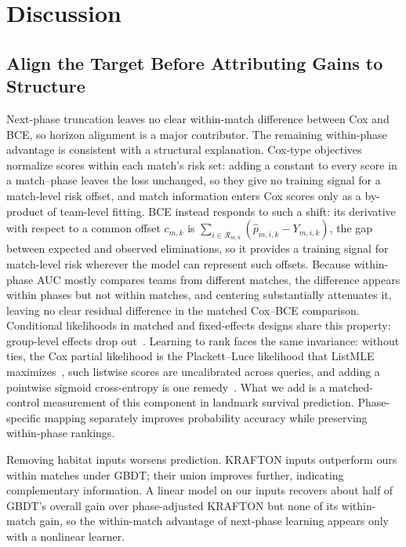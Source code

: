 \documentclass[sigconf,anonymous,nonacm]{acmart}
\begin{document}
\section{Discussion}
\label{sec:discussion}
\subsection{Align the Target Before Attributing Gains to Structure}
\label{sec:discussion:drivers}
Next-phase truncation leaves no clear within-match difference between Cox and BCE, so horizon alignment is a major contributor. The remaining within-phase advantage is consistent with a structural explanation. Cox-type objectives normalize scores within each match's risk set: adding a constant to every score in a match--phase leaves the loss unchanged, so they give no training signal for a match-level risk offset, and match information enters Cox scores only as a by-product of team-level fitting. BCE instead responds to such a shift: its derivative with respect to a common offset $c_{m,k}$ is $\sum_{i\in\mathcal{R}_{m,k}}(\hat p_{m,i,k}-Y_{m,i,k})$, the gap between expected and observed eliminations, so it provides a training signal for match-level risk wherever the model can represent such offsets. Because within-phase AUC mostly compares teams from different matches, the difference appears within phases but not within matches, and centering substantially attenuates it, leaving no clear residual difference in the matched Cox--BCE comparison. Conditional likelihoods in matched and fixed-effects designs share this property: group-level effects drop out~\cite{Chamberlain80}. Learning to rank faces the same invariance: without ties, the Cox partial likelihood is the Plackett--Luce likelihood that ListMLE maximizes~\cite{Xia08}, such listwise scores are uncalibrated across queries, and adding a pointwise sigmoid cross-entropy is one remedy~\cite{Bai23}. What we add is a matched-control measurement of this component in landmark survival prediction. Phase-specific mapping separately improves probability accuracy while preserving within-phase rankings.

Removing habitat inputs worsens prediction. KRAFTON inputs outperform ours within matches under GBDT; their union improves further, indicating complementary information. A linear model on our inputs recovers about half of GBDT's overall gain over phase-adjusted KRAFTON but none of its within-match gain, so the within-match advantage of next-phase learning appears only with a nonlinear learner.
\end{document}
